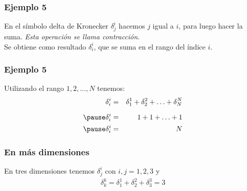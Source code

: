 \documentclass[12pt]{beamer}
\begin{document}
\begin{frame}
\frametitle{Ejemplo 5}
En el símbolo delta de Kronecker $\delta_{j}^{i}$ hacemos $j$ igual a $i$, para luego hacer la suma. \emph{Esta operación se llama contracción}.
\\
\bigskip
\pause
Se obtiene como resultado $\delta_{i}^{i}$, que se suma en el rango del índice $i$.
\end{frame}
\begin{frame}
\frametitle{Ejemplo 5}
Utilizando el rango $1, 2, \ldots, N$ tenemos:
\begin{eqnarray*}
\delta_{i}^{i} &=& \delta_{1}^{1} + \delta_{2}^{2} + \ldots + \delta_{N}^{N} \\[0.5em] \pause
\delta_{i}^{i} &=& 1 + 1 + \ldots +  1 \\[0.em] \pause
\delta_{i}^{i} &=& N
\end{eqnarray*}
\end{frame}
\begin{frame}
\frametitle{En más dimensiones}
En tres dimensiones tenemos $\delta_{j}^{i}$ con $i, j = 1, 2, 3$ y
\begin{align*}
\delta_{k}^{k} = \delta_{1}^{1} + \delta_{2}^{2} + \delta_{3}^{3} = 3
\end{align*}
\end{frame}
\end{document}
